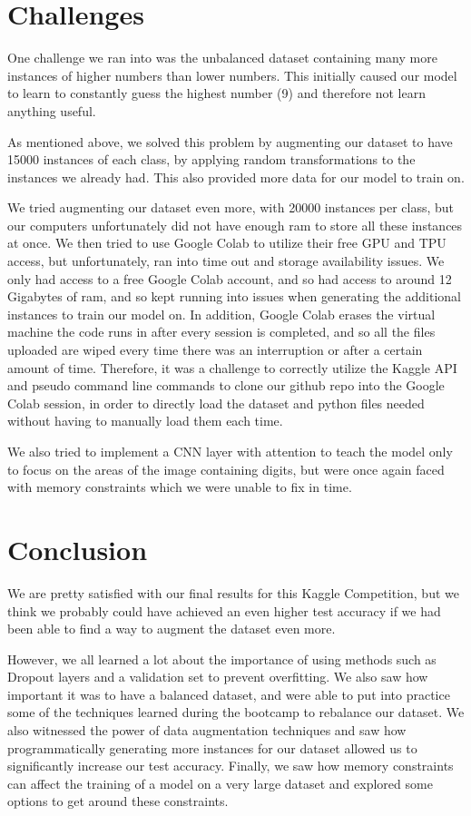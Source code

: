 \documentclass[12pt]{article}
\begin{document}
\section{Challenges}
One challenge we ran into was the unbalanced dataset containing many more instances of higher numbers than lower numbers. This initially caused our model to learn to constantly guess the highest number (9) and therefore not learn anything useful. 

As mentioned above, we solved this problem by augmenting our dataset to have 15000 instances of each class, by applying random transformations to the instances we already had. This also provided more data for our model to train on.

We tried augmenting our dataset even more, with 20000 instances per class, but our computers unfortunately did not have enough ram to store all these instances at once. We then tried to use Google Colab to utilize their free GPU and TPU access, but unfortunately, ran into time out and storage availability issues. We only had access to a free Google Colab account, and so had access to around 12 Gigabytes of ram, and so kept running into issues when generating the additional instances to train our model on. In addition, Google Colab erases the virtual machine the code runs in after every session is completed, and so all the files uploaded are wiped every time there was an interruption or after a certain amount of time. Therefore, it was a challenge to correctly utilize the Kaggle API and pseudo command line commands to clone our github repo into the Google Colab session, in order to directly load the dataset and python files needed without having to manually load them each time.

We also tried to implement a CNN layer with attention to teach the model only to focus on the areas of the image containing digits, but were once again faced with memory constraints which we were unable to fix in time.
\section{Conclusion}
We are pretty satisfied with our final results for this Kaggle Competition, but we think we probably could have achieved an even higher test accuracy if we had been able to find a way to augment the dataset even more. 

However, we all learned a lot about the importance of using methods such as Dropout layers and a validation set to prevent overfitting. We also saw how important it was to have a balanced dataset, and were able to put into practice some of the techniques learned during the bootcamp to rebalance our dataset. We also witnessed the power of data augmentation techniques and saw how programmatically generating more instances for our dataset allowed us to significantly increase our test accuracy. Finally, we saw how memory constraints can affect the training of a model on a very large dataset and explored some options to get around these constraints.
\end{document}
